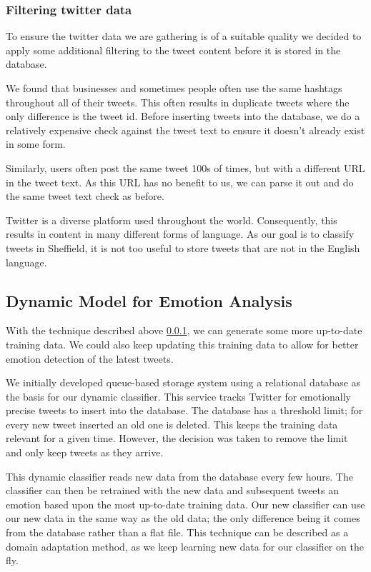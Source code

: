 \subsubsection{Filtering twitter data} \label{filter_twitter_data}

To ensure the twitter data we are gathering is of a suitable quality we decided to apply some additional filtering to the tweet content before it is stored in the database. 

We found that businesses and sometimes people often use the same hashtags throughout all of their tweets. This often results in duplicate tweets where the only difference is the tweet id. Before inserting tweets into the database, we do a relatively expensive check against the tweet text to ensure it doesn't already exist in some form. 

Similarly, users often post the same tweet 100s of times, but with a different URL in the tweet text. As this URL has no benefit to us, we can parse it out and do the same tweet text check as before.

Twitter is a diverse platform used throughout the world. Consequently, this results in content in many different forms of language. As our goal is to classify tweets in Sheffield, it is not too useful to store tweets that are not in the English language.

\subsection{Dynamic Model for Emotion Analysis} \label{dynamic_model_emotion_analysis}

With the technique described above \ref{filter_twitter_data}, we can generate some more up-to-date training data. We could also keep updating this training data to allow for better emotion detection of the latest tweets.

We initially developed queue-based storage system using a relational database as the basis for our dynamic classifier. This service tracks Twitter for emotionally precise tweets to insert into the database. The database has a threshold limit; for every new tweet inserted an old one is deleted. This keeps the training data relevant for a given time. However, the decision was taken to remove the limit and only keep tweets as they arrive.

This dynamic classifier reads new data from the database every few hours. The classifier can then be retrained with the new data and subsequent tweets an emotion based upon the most up-to-date training data. Our new classifier can use our new data in the same way as the old data; the only difference being it comes from the database rather than a flat file. This technique can be described as a domain adaptation method, as we keep learning new data for our classifier on the fly.


